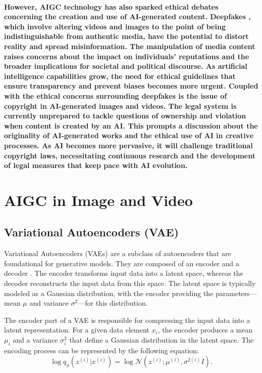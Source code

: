 \documentclass[11pt,a4paper,oneside]{report}
\begin{document}
\paragraph{However, AIGC technology has also sparked ethical debates concerning the creation and use of AI-generated content. 
Deepfakes \cite{westerlund2019emergence}, which involve altering videos and images to the point of being indistinguishable from authentic media, have the potential to distort reality and spread misinformation. 
The manipulation of media content raises concerns about the impact on individuals' reputations and the broader implications for societal and political discourse. 
As artificial intelligence capabilities grow, the need for ethical guidelines that ensure transparency and prevent biases becomes more urgent.
Coupled with the ethical concerns surrounding deepfakes is the issue of copyright in AI-generated images and videos. \cite{hristov2016artificial}
The legal system is currently unprepared to tackle questions of ownership and violation when content is created by an AI. 
This prompts a discussion about the originality of AI-generated works and the ethical use of AI in creative processes. 
As AI becomes more pervasive, it will challenge traditional copyright laws, necessitating continuous research and the development of legal measures that keep pace with AI evolution.}

\section{AIGC in Image and Video}

\subsection{Variational Autoencoders (VAE)}

Variational Autoencoders (VAEs) are a subclass of autoencoders that are foundational for generative models. They are composed of an encoder and a decoder \cite{cho2014properties}. The encoder transforms input data into a latent space, whereas the decoder reconstructs the input data from this space. The latent space is typically modeled as a Gaussian distribution, with the encoder providing the parameters—mean $\mu$ and variance $\sigma^2$—for this distribution.

The encoder part of a VAE is responsible for compressing the input data into a latent representation. For a given data element $x_i$, the encoder produces a mean $\mu_i$ and a variance $\sigma^2_i$ that define a Gaussian distribution in the latent space. The encoding process can be represented by the following equation:
\begin{equation}
\log q_{\phi} \left( z^{(i)} | x^{(i)} \right) = \log \mathcal{N} \left( z^{(i)}; \mu^{(i)}, \sigma^{2(i)} I \right).
\end{equation}
\end{document}
